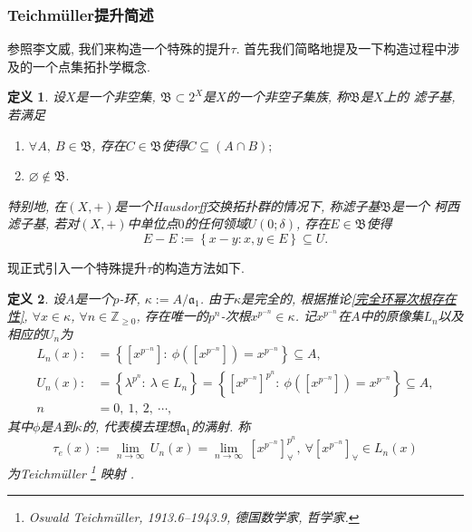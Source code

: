 \documentclass[UTF8, twoside]{ctexart}
\theoremstyle{nonumberplain}
\theoremstyle{nonumberplain}
\theoremstyle{plain}
\newtheorem{dingyi4}{定义}[subsubsection]
\begin{document}
	\subsubsection{Teichmüller提升简述}
	参照李文威\cite[命题10.9.4]{liwenwei}, 我们来构造一个特殊的提升$\tau $. 首先我们简略地提及一下构造过程中涉及的一个点集拓扑学概念.
	\begin{dingyi4} \label{滤子基定义}
		设$X$是一个非空集, $\mathfrak{B}\subset {{2}^{X}}$是$X$的一个非空子集族, 称$\mathfrak{B}$是$X$上的
		{\heiti 滤子基}, 若满足
		\begin{enumerate}
			\item $\forall A,\ B\in \mathfrak{B}$, 存在$C\in \mathfrak{B}$使得$C\subseteq \left( A\cap B \right);$
			\item $\varnothing \notin \mathfrak{B}.$
		\end{enumerate}
		特别地, 在$\left( X,+ \right)$是一个Hausdorff交换拓扑群的情况下, 
		称滤子基$\mathfrak{B}$是一个
		{\heiti 柯西滤子基}, 
		若对$\left( X,+ \right)$中单位点$0$的任何领域$U\left( 0;\delta  \right)$, 存在$E\in \mathfrak{B}$使得
		\[
			E-E:=\left\{ x-y:x,y\in E \right\}\subseteq U.
		\]
	\end{dingyi4}
	\vskip 0.5cm
	
	现正式引入一个特殊提升$\tau$的构造方法如下.
	\begin{dingyi4} \label{Tei提升定义}
		设$A$是一个$p$-环, $\kappa :=A/{{\mathfrak{a}}_{1}}$. 由于$\kappa $是完全的, 根据推论\ref{完全环幂次根存在性}, $\forall x\in \kappa $, $\forall n\in {{\mathbb{Z}}_{\ge 0}}$, 存在唯一的${{p}^{n}}$-次根${{x}^{{{p}^{-n}}}}\in \kappa $. 
		记${{x}^{{{p}^{-n}}}}$在$A$中的原像集${{L}_{n}}$以及相应的${{U}_{n}}$为
		\begin{align*}
			{{L}_{n}}\left( x \right):&=\left\{ \left[ {{x}^{{{p}^{-n}}}} \right]:\ \phi \left( \left[ {{x}^{{{p}^{-n}}}} \right] \right)={{x}^{{{p}^{-n}}}} \right\}\subseteq A, \\ 
			{{U}_{n}}\left( x \right):&=\left\{ {{\lambda }^{{{p}^{n}}}}:\ \lambda \in {{L}_{n}} \right\}=\left\{ {{\left[ {{x}^{{{p}^{-n}}}} \right]}^{{{p}^{n}}}}:\ \phi \left( \left[ {{x}^{{{p}^{-n}}}} \right] \right)={{x}^{{{p}^{-n}}}} \right\}\subseteq A,\\
			n&=0,\ 1,\ 2,\ \cdots,
		\end{align*}
		其中$\phi $是$A$到$\kappa $的, 代表模去理想${{\mathfrak{a}}_{1}}$的满射.
		称
		\begin{equation} \label{Tei提升定义式}
			{{\tau }_{e}}\left( x \right):=\underset{n\to \infty }{\mathop{\lim }}\,{{U}_{n}}\left( x \right)=\underset{n\to \infty }{\mathop{\lim }}\,\left[ {{x}^{{{p}^{-n}}}} \right]_{\forall }^{{{p}^{n}}},
			\ \forall \left[ {{x}^{{{p}^{-n}}}} \right]_{\forall }\in {{L}_{n}}\left( x \right)
		\end{equation}
		为{\heiti Teichmüller
			\footnote{Oswald Teichmüller, 1913.6--1943.9, 德国数学家, 哲学家.}
			映射}
		. 
	\end{dingyi4}
	\vskip 0.5cm
	
\end{document}
